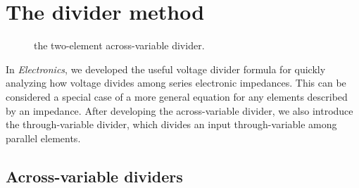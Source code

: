 \documentclass[dynamic_systems.tex]{subfiles}
\begin{document}
\section{The divider method}
\tags{}
\label{lec:divider_method}

\setlength\intextsep{0pt}
\begin{wrapfigure}{r}{0.4\textwidth}
  \centering
  \caption{\label{fig:impedance_across_divider} the two-element across-variable divider.}%
\end{wrapfigure}

In \emph{Electronics}, we developed the useful voltage divider formula for quickly analyzing how voltage divides among series electronic impedances.
This can be considered a special case of a more general  equation for any elements described by an impedance.
After developing the across-variable divider, we also introduce the through-variable divider, which divides an input through-variable among parallel elements.

\subsection{Across-variable dividers}
\tags{}
\end{document}
